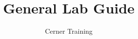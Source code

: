



\title{General Lab Guide} %
\author{Cerner Training} %


\makeatletter
\pretocmd{\part}{\setcounter{footnote}{0}}{}{}
\makeatother



    \frontmatter
    \maketitle %

